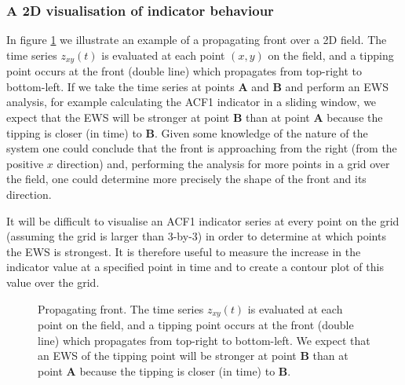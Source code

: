 \subsubsection{A 2D visualisation of indicator behaviour}

In figure \ref{fig:tikz-approachingfront} we illustrate an example of a propagating front over a 2D field. The time series $z_{xy}(t)$ is evaluated at each point $(x,y)$ on the field, and a tipping point occurs at the front (double line) which propagates from top-right to bottom-left. If we take the time series at points {\bf A} and {\bf B} and perform an EWS analysis, for example calculating the ACF1 indicator in a sliding window, we expect that the EWS will be stronger at point {\bf B} than at point {\bf A} because the tipping is closer (in time) to {\bf B}. Given some knowledge of the nature of the system one could conclude that the front is approaching from the right (from the positive $x$ direction) and, performing the analysis for more points in a grid over the field, one could determine more precisely the shape of the front and its direction. 

It will be difficult to visualise an ACF1 indicator series at every point on the grid (assuming the grid is larger than 3-by-3) in order to determine at which points the EWS is strongest. It is therefore useful to measure the increase in the indicator value at a specified point in time and to create a contour plot of this value over the grid.

\begin{figure}
	\centering
	\caption{Propagating front. The time series $z_{xy}(t)$ is evaluated at each point on the field, and a tipping point occurs at the front (double line) which propagates from top-right to bottom-left. We expect that an EWS of the tipping point will be stronger at point {\bf B} than at point {\bf A} because the tipping is closer (in time) to {\bf B}.}
	\label{fig:tikz-approachingfront}
\end{figure}

